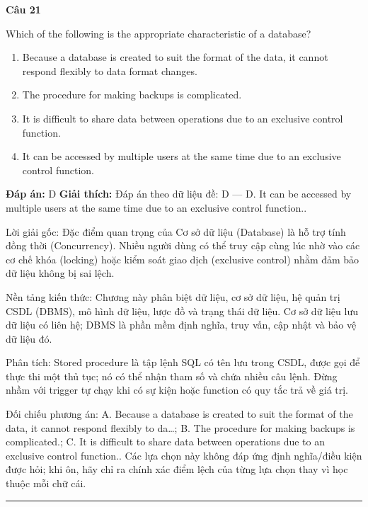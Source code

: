 \documentclass[11pt,a4paper]{article}
\newenvironment{question}[1]{%
  \par\vspace{1em}\noindent\textbf{\large Câu #1}\par\vspace{0.4em}
}{%
  \par\vspace{1em}\hrule\vspace{0.6em}
}
\newenvironment{choices}{%
  \begin{enumerate}[label=\textbf{\Alph*.},leftmargin=2.2em,itemsep=2pt,topsep=3pt]
}{%
  \end{enumerate}
}
\newcommand{\choice}{\item}
\begin{document}
\begin{question}{21}
Which of the following is the appropriate characteristic of a database?
\begin{choices}
\choice Because a database is created to suit the format of the data, it cannot respond flexibly to data format changes.
\choice The procedure for making backups is complicated.
\choice It is difficult to share data between operations due to an exclusive control function.
\choice It can be accessed by multiple users at the same time due to an exclusive control function.
\end{choices}
\textbf{Đáp án:} D
\textbf{Giải thích:} Đáp án theo dữ liệu đề: D — D. It can be accessed by multiple users at the same time due to an exclusive control function..

Lời giải gốc: Đặc điểm quan trọng của Cơ sở dữ liệu (Database) là hỗ trợ tính đồng thời (Concurrency). Nhiều người dùng có thể truy cập cùng lúc nhờ vào các cơ chế khóa (locking) hoặc kiểm soát giao dịch (exclusive control) nhằm đảm bảo dữ liệu không bị sai lệch.

Nền tảng kiến thức: Chương này phân biệt dữ liệu, cơ sở dữ liệu, hệ quản trị CSDL (DBMS), mô hình dữ liệu, lược đồ và trạng thái dữ liệu. Cơ sở dữ liệu lưu dữ liệu có liên hệ; DBMS là phần mềm định nghĩa, truy vấn, cập nhật và bảo vệ dữ liệu đó.

Phân tích: Stored procedure là tập lệnh SQL có tên lưu trong CSDL, được gọi để thực thi một thủ tục; nó có thể nhận tham số và chứa nhiều câu lệnh. Đừng nhầm với trigger tự chạy khi có sự kiện hoặc function có quy tắc trả về giá trị.

Đối chiếu phương án: A. Because a database is created to suit the format of the data, it cannot respond flexibly to da…; B. The procedure for making backups is complicated.; C. It is difficult to share data between operations due to an exclusive control function.. Các lựa chọn này không đáp ứng định nghĩa/điều kiện được hỏi; khi ôn, hãy chỉ ra chính xác điểm lệch của từng lựa chọn thay vì học thuộc mỗi chữ cái.
\end{question}
\end{document}
